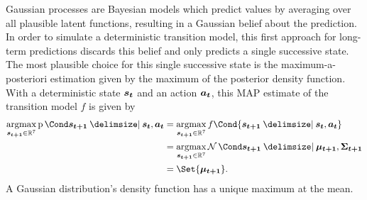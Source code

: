 Gaussian processes are Bayesian models which predict values by averaging over all plausible latent functions, resulting in a Gaussian belief about the prediction.
In order to simulate a deterministic transition model, this first approach for long-term predictions discards this belief and only predicts a single successive state.
The most plausible choice for this single successive state is the maximum-a-posteriori estimation given by the maximum of the posterior density function.
With a deterministic state $\bm{s_t}$ and an action $\bm{a_t}$, this MAP estimate of the transition model $f$ is given by
\begin{align}
    \begin{split}
        \argmax_{\mat{s_{t+1}} \in \R^7} \Prob{\mat{s_{t+1}} \given \mat{s_t}, \mat{a_t}} &= \argmax_{\mat{s_{t+1}} \in \R^7} f\Cond{\mat{s_{t+1}} \given \mat{s_t}, \mat{a_t}} \\
        &= \argmax_{\mat{s_{t+1}} \in \R^7} \Gaussian{\mat{s_{t+1}} \given \mat{\mu_{t+1}}, \mat{\Sigma_{t+1}}} \\
        &= \Set{\mat{\mu_{t+1}}}.
    \end{split}
\end{align}
A Gaussian distribution's density function has a unique maximum at the mean.

